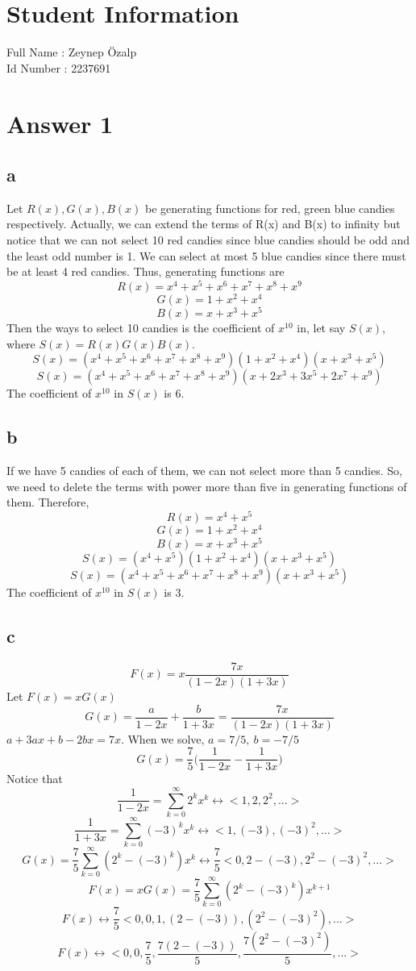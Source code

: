 \documentclass[12pt]{article}
\begin{document}
\section*{Student Information } 
Full Name : Zeynep Özalp \\
Id Number : 2237691 \\

\section*{Answer 1}
\subsection*{a} 
Let $R(x), G(x), B(x)$ be generating functions for red, green blue candies respectively. Actually, we can extend the terms of R(x) and B(x) to infinity but notice that we can not select 10 red candies since blue candies should be odd and the least odd number is 1. We can select at most 5 blue candies since there must be at least 4  red candies. Thus, generating functions are
$$R(x)=x^4+x^5+x^6+x^7+x^8+x^9$$  
$$G(x)=1+x^2+x^4$$ 
$$B(x)=x+x^3+x^5$$    
Then the ways to select 10 candies is the coefficient of $x^{10}$ in, let say $S(x)$, where $S(x)=R(x)G(x)B(x)$.
$$S(x)=(x^4+x^5+x^6+x^7+x^8+x^9)(1+x^2+x^4)(x+x^3+x^5)$$ 
$$S(x)=(x^4+x^5+x^6+x^7+x^8+x^9)(x+2x^3+3x^5+2x^7+x^9)$$
The coefficient of $x^{10}$ in $S(x)$ is 6.
\subsection*{b}
If we have 5 candies of each of them, we can not select more than 5 candies. So, we need to delete the terms with power more than five in generating functions of them. Therefore,
$$R(x)=x^4+x^5$$  
$$G(x)=1+x^2+x^4$$ 
$$B(x)=x+x^3+x^5$$ 
$$S(x)=(x^4+x^5)(1+x^2+x^4)(x+x^3+x^5)$$
$$S(x)=(x^4+x^5+x^6+x^7+x^8+x^9)(x+x^3+x^5)$$
The coefficient of $x^{10}$ in $S(x)$ is 3.
\subsection*{c}
$$F(x)=x\dfrac{7x}{(1-2x)(1+3x)}$$
Let $F(x)=xG(x)$
$$G(x)=\dfrac{a}{1-2x}+\dfrac{b}{1+3x}=\dfrac{7x}{(1-2x)(1+3x)}$$
$a+3ax+b-2bx=7x$. When we solve, $a=7/5,\ b=-7/5$
$$G(x)=\frac{7}{5}\bigg( \dfrac{1}{1-2x}-\dfrac{1}{1+3x}\bigg)$$
Notice that
$$\dfrac{1}{1-2x}=\sum_{k=0}^{\infty}2^kx^k \longleftrightarrow <1,2,2^2,...>$$
$$\dfrac{1}{1+3x}=\sum_{k=0}^{\infty}(-3)^kx^k \longleftrightarrow <1,(-3),(-3)^2,...>$$
$$G(x)=\frac{7}{5}\sum_{k=0}^{\infty}(2^k-(-3)^k)x^k\longleftrightarrow \frac{7}{5}<0,2-(-3),2^2-(-3)^2,...>$$
$$F(x)=xG(x)=\frac{7}{5}\sum_{k=0}^{\infty}(2^k-(-3)^k)x^{k+1}$$
$$F(x)\longleftrightarrow \frac{7}{5}<0,0,1,(2-(-3)),(2^2-(-3)^2),...>$$
$$F(x)\longleftrightarrow <0,0,\frac{7}{5},\frac{7(2-(-3))}{5},\frac{7(2^2-(-3)^2)}{5},...>$$
\end{document}
